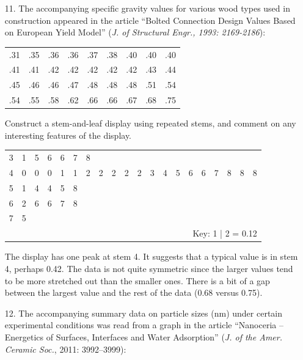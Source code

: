 \documentclass[letterpaper,12pt]{article}
\begin{document}
\maketitle

\begin{enumerate}
  \item[11.]
    The accompanying specific gravity values for various wood types used in construction appeared in the article ``Bolted Connection Design Values Based on European Yield Model'' (\textit{J. of Structural Engr., 1993: 2169-2186}):
    \begin{center}
      \begin{tabular}{l l l l l l l l l}
        .31 & .35 & .36 & .36 & .37 & .38 & .40 & .40 & .40 \\
        .41 & .41 & .42 & .42 & .42 & .42 & .42 & .43 & .44 \\
        .45 & .46 & .46 & .47 & .48 & .48 & .48 & .51 & .54 \\
        .54 & .55 & .58 & .62 & .66 & .66 & .67 & .68 & .75
      \end{tabular}
    \end{center}
    Construct a stem-and-leaf display using repeated stems, and comment on any interesting features of the display.
    \begin{center}
      \begin{tabular}{c | c c c c c c c c c c c c c c c c c c c}
        3 & 1 & 5 & 6 & 6 & 7 & 8 \\
        4 & 0 & 0 & 0 & 1 & 1 & 2 & 2 & 2 & 2 & 2 & 3 & 4 & 5 & 6 & 6 & 7 & 8 & 8 & 8 \\
        5 & 1 & 4 & 4 & 5 & 8 \\
        6 & 2 & 6 & 6 & 7 & 8\\
        7 & 5 \\
        \multicolumn{20}{r}{Key: 1 | 2 = 0.12}
      \end{tabular}
    \end{center}
    The display has one peak at stem 4. It suggests that a typical value is in stem 4, perhaps 0.42. The data is not quite symmetric since the larger values tend to be more stretched out than the smaller ones. There is a bit of a gap between the largest value and the rest of the data (0.68 versus 0.75).
  \item[12.]
    The accompanying summary data on  particle sizes (nm) under certain experimental conditions was read from a graph in the article ``Nanoceria – Energetics of Surfaces, Interfaces and Water Adsorption'' (\textit{J. of the Amer. Ceramic Soc.}, 2011: 3992–3999):

\end{enumerate}
\end{document}
